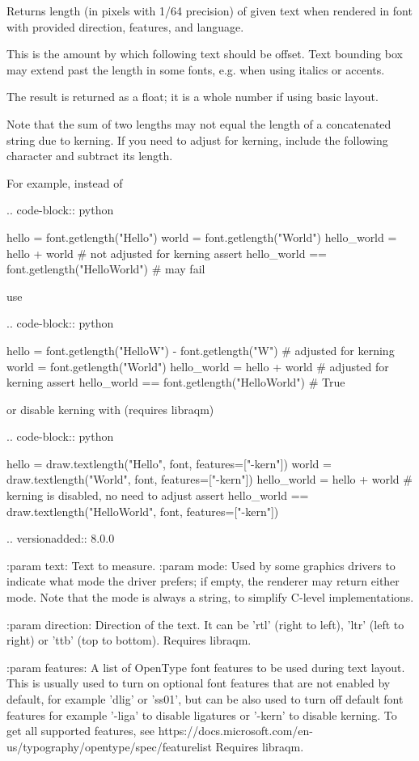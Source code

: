 \begin{DoxyVerb}Returns length (in pixels with 1/64 precision) of given text when rendered
in font with provided direction, features, and language.

This is the amount by which following text should be offset.
Text bounding box may extend past the length in some fonts,
e.g. when using italics or accents.

The result is returned as a float; it is a whole number if using basic layout.

Note that the sum of two lengths may not equal the length of a concatenated
string due to kerning. If you need to adjust for kerning, include the following
character and subtract its length.

For example, instead of

.. code-block:: python

  hello = font.getlength("Hello")
  world = font.getlength("World")
  hello_world = hello + world  # not adjusted for kerning
  assert hello_world == font.getlength("HelloWorld")  # may fail

use

.. code-block:: python

  hello = font.getlength("HelloW") - font.getlength("W")  # adjusted for kerning
  world = font.getlength("World")
  hello_world = hello + world  # adjusted for kerning
  assert hello_world == font.getlength("HelloWorld")  # True

or disable kerning with (requires libraqm)

.. code-block:: python

  hello = draw.textlength("Hello", font, features=["-kern"])
  world = draw.textlength("World", font, features=["-kern"])
  hello_world = hello + world  # kerning is disabled, no need to adjust
  assert hello_world == draw.textlength("HelloWorld", font, features=["-kern"])

.. versionadded:: 8.0.0

:param text: Text to measure.
:param mode: Used by some graphics drivers to indicate what mode the
     driver prefers; if empty, the renderer may return either
     mode. Note that the mode is always a string, to simplify
     C-level implementations.

:param direction: Direction of the text. It can be 'rtl' (right to
          left), 'ltr' (left to right) or 'ttb' (top to bottom).
          Requires libraqm.

:param features: A list of OpenType font features to be used during text
         layout. This is usually used to turn on optional
         font features that are not enabled by default,
         for example 'dlig' or 'ss01', but can be also
         used to turn off default font features for
         example '-liga' to disable ligatures or '-kern'
         to disable kerning.  To get all supported
         features, see
         https://docs.microsoft.com/en-us/typography/opentype/spec/featurelist
         Requires libraqm.


\end{DoxyVerb}
